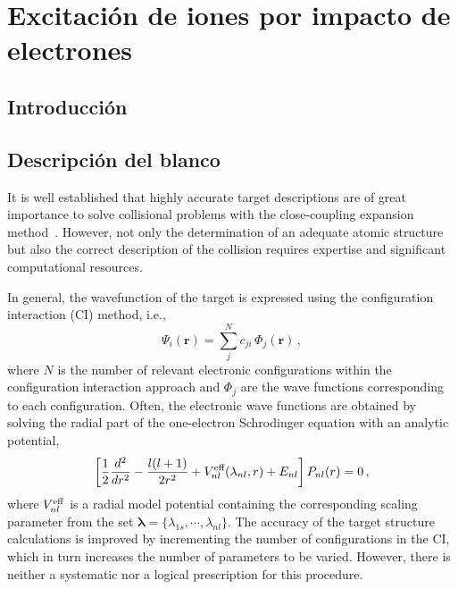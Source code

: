 \chapter{Excitación de iones por impacto de electrones}

\section{Introducción}
\label{sec:intro}

\section{Descripción del blanco}

It is well established that highly accurate target descriptions are of
great importance to solve collisional problems with the close-coupling
expansion method~\cite{Bartschat:04,Zatsarinny:16,Ballance:03}. 
However, not only the determination of an adequate atomic structure but 
also the correct description of the collision requires expertise and 
significant computational resources. 

In general, the wavefunction of the target is expressed using the
configuration interaction (CI) method, i.e.,
\begin{equation*}
\Psi_i(\mathbf{r}) =
\sum_j^{N} c_{ji} \, \Phi_j(\mathbf{r})\,,
\end{equation*}
where $N$ is the number of relevant electronic configurations within
the configuration interaction approach and $\Phi_j$ are the wave
functions corresponding to each configuration.
Often, the electronic wave functions are obtained by solving the 
radial part of the one-electron Schrodinger equation with an analytic
potential, 
\begin{equation*}
\left[ \frac{1}{2} \frac{d^2}{dr^2} - \frac{l(l+1)}{2r^2} 
 + V_{nl}^{\mbox{\scriptsize eff}}(\lambda_{nl},r)
 + E_{nl} \right] P_{nl}(r)=0\,,
\end{equation*}
where $V_{nl}^{\mbox{\scriptsize eff}}$ is a radial model potential 
containing the corresponding scaling parameter from the set 
$\boldsymbol\lambda=\{\lambda_{1s},\cdots,\lambda_{nl}\}$. The accuracy 
of the target structure calculations is improved by incrementing the 
number of configurations in the CI, which in turn increases the number 
of parameters to be varied. However, there is neither a systematic nor a 
logical prescription for this procedure.

